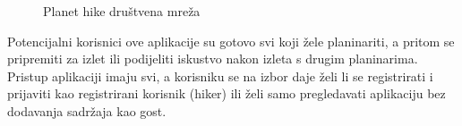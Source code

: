 \begin{figure}[H]
\centering     
{}
\hspace{10 pt}
\hspace{10 pt}
\caption{Planet hike društvena mreža}
\end{figure}

Potencijalni korisnici ove aplikacije su gotovo svi koji žele planinariti, a pritom se pripremiti za izlet ili podijeliti iskustvo nakon izleta s drugim planinarima. Pristup aplikaciji imaju svi, a korisniku se na izbor daje želi li se registrirati i prijaviti kao registrirani korisnik (hiker) ili želi samo pregledavati aplikaciju bez dodavanja sadržaja kao gost.\vspace{10pt}

